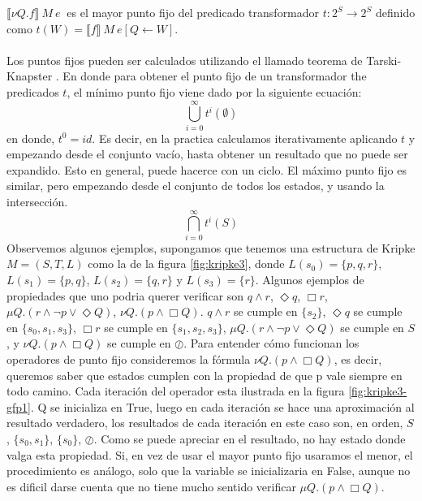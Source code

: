 \noindent $\llbracket \nu Q. f \rrbracket  \ M\ e\ $ es el mayor punto fijo del predicado transformador $t:2^{S} \to 2^{S}$ definido como $t(W) = \llbracket f \rrbracket \ M\ e[Q \gets W] $.\\
\\
Los puntos fijos pueden ser calculados utilizando el llamado teorema de Tarski-Knapster \cite{Tarski:17}. En donde para obtener el punto fijo de un transformador the predicados $t$, el mínimo punto fijo viene dado por la siguiente ecuación:
$$
	\bigcup^\infty_{i=0} t^i(\emptyset)
$$
en donde, $t^0 = id$. Es decir, en la practica calculamos iterativamente aplicando $t$ y empezando desde el conjunto vacío, hasta obtener un resultado que no puede ser expandido. Esto en general, puede hacerce con un ciclo. El máximo punto fijo es similar, pero empezando desde el conjunto de
todos los estados, y usando la intersección.
$$
	\bigcap^\infty_{i=0} t^i(S)
$$
Observemos algunos ejemplos, supongamos que tenemos una estructura de Kripke $M = (S,T,L)$ como la de la figura \ref{fig:kripke3}, donde $L(s_{0}) = \{p,q,r\}$, $L(s_{1}) = \{p,q\}$, $L(s_{2}) = \{q,r\}$ y $L(s_{3}) = \{r\}$. Algunos ejemplos de propiedades que uno podria querer verificar son $q \land r$, $\Diamond q$, $\Box r$, $\mu Q. (r \land \neg p \lor \Diamond Q)$, $\nu Q. (p \land \Box Q)$. $q \land r$ se cumple en $\{s_{2}\}$, $\Diamond q$ se cumple en $\{s_{0},s_{1},s_{3}\}$, $\Box r$ se cumple en $\{s_{1},s_{2},s_{3}\}$, $\mu Q. (r \land \neg p \lor \Diamond Q)$ se cumple en $S$, y $\nu Q. (p \land \Box Q)$ se cumple en $\oslash$. Para entender cómo funcionan los operadores de punto fijo consideremos la fórmula $\nu Q. (p \land \Box Q)$, es decir, queremos saber que estados cumplen con la propiedad de que p vale siempre en todo camino. Cada iteración del operador esta ilustrada en la figura \ref{fig:kripke3-gfp1}. Q se inicializa en True, luego en cada iteración se hace una aproximación al resultado verdadero, los resultados de cada iteración en este caso son, en orden, $S$, $\{s_{0},s_{1}\}$, $\{s_{0}\}$, $\oslash$. Como se puede apreciar en el resultado, no hay estado donde valga esta propiedad. Si, en vez de usar el mayor punto fijo usaramos el menor, el procedimiento es análogo, solo que la variable se inicializaria en False, aunque no es dificil darse cuenta que no tiene mucho sentido verificar $\mu Q.(p \land \Box Q)$.

